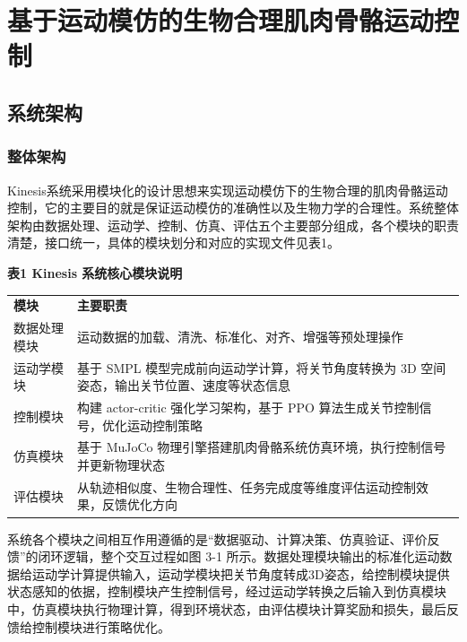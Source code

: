
\chapter{基于运动模仿的生物合理肌肉骨骼运动控制}

\section{系统架构}\label{ux7cfbux7edfux67b6ux6784}

\subsection{整体架构}\label{ux6574ux4f53ux67b6ux6784}

Kinesis系统采用模块化的设计思想来实现运动模仿下的生物合理的肌肉骨骼运动控制，它的主要目的就是保证运动模仿的准确性以及生物力学的合理性。系统整体架构由数据处理、运动学、控制、仿真、评估五个主要部分组成，各个模块的职责清楚，接口统一，具体的模块划分和对应的实现文件见表1。

\begin{center}\textbf{表1 Kinesis 系统核心模块说明}\end{center}

\begin{longtable}[]{@{}
  >{\raggedright\arraybackslash}p{}
  >{\raggedright\arraybackslash}p{}@{}}
\toprule\noalign{}
\endhead
\bottomrule\noalign{}
\endlastfoot
\textbf{模块} & \textbf{主要职责} \\
数据处理模块 & 运动数据的加载、清洗、标准化、对齐、增强等预处理操作 \\
运动学模块 & 基于 SMPL 模型完成前向运动学计算，将关节角度转换为 3D
空间姿态，输出关节位置、速度等状态信息 \\
控制模块 & 构建 actor-critic 强化学习架构，基于 PPO
算法生成关节控制信号，优化运动控制策略 \\
仿真模块 & 基于 MuJoCo
物理引擎搭建肌肉骨骼系统仿真环境，执行控制信号并更新物理状态 \\
评估模块 &
从轨迹相似度、生物合理性、任务完成度等维度评估运动控制效果，反馈优化方向 \\
\end{longtable}

系统各个模块之间相互作用遵循的是“数据驱动、计算决策、仿真验证、评价反馈”的闭环逻辑，整个交互过程如图
3-1
所示。数据处理模块输出的标准化运动数据给运动学计算提供输入，运动学模块把关节角度转成3D姿态，给控制模块提供状态感知的依据，控制模块产生控制信号，经过运动学转换之后输入到仿真模块中，仿真模块执行物理计算，得到环境状态，由评估模块计算奖励和损失，最后反馈给控制模块进行策略优化。

